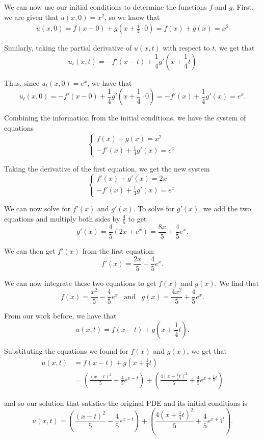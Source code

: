 \documentclass[11pt]{article}
\begin{document}
\begin{enumerate}[a)]
We can now use our initial conditions to determine the functions $f$ and $g$. First, we are given that $u(x, 0) = x^2$, so we know that
\begin{align*}
	u(x, 0) = f(x-0) + g\left(x + \frac{1}{4}\cdot 0 \right) = f(x) + g(x) = x^2
\end{align*}

Similarly, taking the partial derivative of $u(x, t)$ with respect to $t$, we get that
\[ u_t(x, t) = -f'(x-t) + \frac{1}{4}g'\left(x+\frac{1}{4}t \right)\]

Thus, since $u_t(x, 0) = e^x$, we have that
\[ u_t(x, 0) = -f'(x-0) + \frac{1}{4}g'\left(x+\frac{1}{4}\cdot0 \right) = -f'(x) + \frac{1}{4}g'(x) = e^x.\]

Combining the information from the initial conditions, we have the system of equations
\[\begin{cases}
f(x) + g(x) = x^2 \\
-f'(x) + \frac{1}{4}g'(x) = e^x
\end{cases}\]

Taking the derivative of the first equation, we get the new system
\[\begin{cases}
	f'(x) + g'(x) = 2x \\
	-f'(x) + \frac{1}{4}g'(x) = e^x
\end{cases}\]

We can now solve for $f'(x)$ and $g'(x)$. To solve for $g'(x)$, we add the two equations and multiply both sides by $\frac{4}{5}$ to get 
\[g'(x) = \frac{4}{5} \left(2x+e^x\right) = \frac{8x}{5} + \frac{4}{5}e^x.\]

We can then get $f'(x)$ from the first equation: \[f'(x) = \frac{2x}{5} - \frac{4}{5}e^x.\]

We can now integrate these two equations to get $f(x)$ and $g(x)$. We find that
\[f(x) = \frac{x^2}{5} -\frac{4}{5}e^x \, \, \, \text { and } \, \, \, g(x) = \frac{4x^2}{5} + \frac{4}{5}e^x. \]

From our work before, we have that
\[ u(x, t) = f(x-t) + g\left( x + \frac{1}{4}t \right).\]

Substituting the equations we found for $f(x)$ and $g(x)$, we get that
\begin{align*}u(x, t) &= f(x-t) + g\left( x + \frac{1}{4}t \right) \\
	&= \left(\frac{(x-t)^2}{5} -\frac{4}{5}e^{x-t} \right) + \left(\frac{4(x+\frac{1}{4}t)^2}{5}+ \frac{4}{5}e^{x+\frac{1}{4}t}\right)
\end{align*}

and so our solution that satisfies the original PDE and its initial conditions is 
\[ \boxed{u(x, t) = \left(\frac{(x-t)^2}{5} -\frac{4}{5}e^{x-t} \right) + \left(\frac{4(x+\frac{1}{4}t)^2}{5}+ \frac{4}{5}e^{x+\frac{1}{4}t}\right) }.\]
\end{enumerate}
\end{document}
